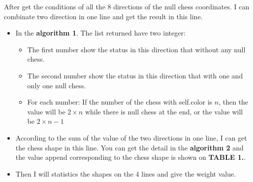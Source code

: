 \documentclass[conference,compsoc]{IEEEtran}
\begin{document}
  After get the conditions of all the 8 directions of the null chess coordinates.
  I can combinate two direction in one line and get the result in this line.
  \begin{itemize}
    \item In the \textbf{algorithm 1}. The list returned have two integer:
          \begin{itemize} 
            \item The first number show the status in this direction that without any null chess.
            \item The second number show the status in this direction that with one and only one null chess.
            \item For each number: If the number of the chess with self.color is $n$, then the value will be $2\times n$ while there is null chess at the end, or the value will be $2\times n -1$
          \end{itemize}
    \item According to the sum of the value of the two directions in one line, I can get the chess shape in this line. You can get the detail in the \textbf{algorithm 2} and the value append corresponding to the chess shape is shown on \textbf{TABLE 1.}.
    \item Then I will statistics the shapes on the 4 lines and give the weight value.
  \end{itemize}
\end{document}
